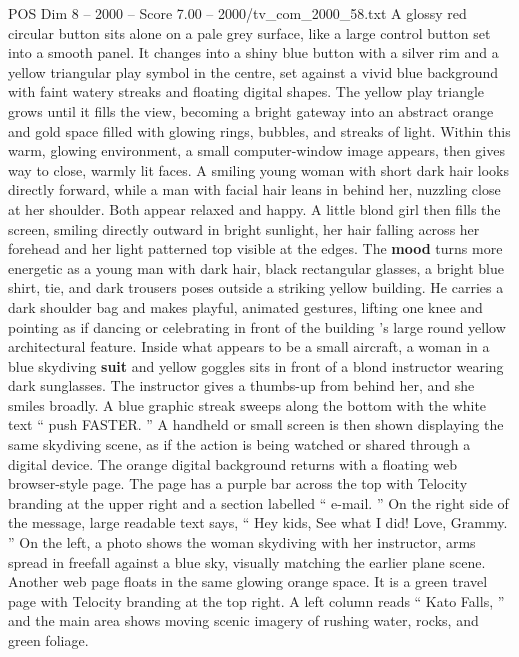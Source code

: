 \begin{textsample}{POS Dim 8 – 2000 – Score 7.00 – 2000/tv\_com\_2000\_58.txt}  \label{ex:f8_pos_012}
A glossy red circular button sits alone on a pale grey surface, like a large control button set into a smooth panel.
It changes into a shiny blue button with a silver rim and a yellow triangular play symbol in the centre, set against a vivid blue background with faint watery streaks and floating digital shapes.
The yellow play triangle grows until it fills the view, becoming a bright gateway into an abstract orange and gold space filled with glowing rings, bubbles, and streaks of light.
Within this warm, glowing environment, a small computer-window image appears, then gives way to close, warmly lit faces.
A smiling young woman with short dark hair looks directly forward, while a man with facial hair leans in behind her, nuzzling close at her shoulder.
Both appear relaxed and happy.
A little blond girl then fills the screen, smiling directly outward in bright sunlight, her hair falling across her forehead and her light patterned top visible at the edges.
The \textbf{mood} turns more energetic as a young man with dark hair, black rectangular glasses, a bright blue shirt, tie, and dark trousers poses outside a striking yellow building.
He carries a dark shoulder bag and makes playful, animated gestures, lifting one knee and pointing as if dancing or celebrating in front of the building ’s large round yellow architectural feature.
Inside what appears to be a small aircraft, a woman in a blue skydiving \textbf{suit} and yellow goggles sits in front of a blond instructor wearing dark sunglasses.
The instructor gives a thumbs-up from behind her, and she smiles broadly.
A blue graphic streak sweeps along the bottom with the white text “ push FASTER. ” A handheld or small screen is then shown displaying the same skydiving scene, as if the action is being watched or shared through a digital device.
The orange digital background returns with a floating web browser-style page.
The page has a purple bar across the top with Telocity branding at the upper right and a section labelled “ e-mail. ” On the right side of the message, large readable text says, “ Hey kids, See what I did!
Love, Grammy. ” On the left, a photo shows the woman skydiving with her instructor, arms spread in freefall against a blue sky, visually matching the earlier plane scene.
Another web page floats in the same glowing orange space.
It is a green travel page with Telocity branding at the top right.
A left column reads “ Kato Falls, ” and the main area shows moving scenic imagery of rushing water, rocks, and green foliage.

\end{textsample}

